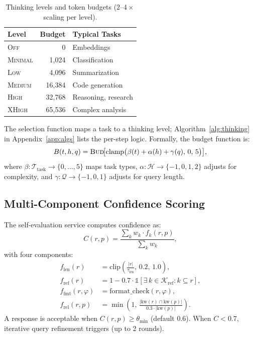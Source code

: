 \documentclass{article}
\theoremstyle{plain}
\theoremstyle{definition}
\newcommand{\indicator}{\mathbb{1}}
\begin{document}
\begin{table}[t]
\caption{Thinking levels and token budgets ($2$--$4\times$ scaling per level).}
\label{tab:thinking}
\centering
\small
\begin{tabular}{@{}lrl@{}}
\toprule
\textbf{Level} & \textbf{Budget} & \textbf{Typical Tasks} \\
\midrule
\textsc{Off}     & 0       & Embeddings \\
\textsc{Minimal} & 1{,}024   & Classification \\
\textsc{Low}     & 4{,}096   & Summarization \\
\textsc{Medium}  & 16{,}384  & Code generation \\
\textsc{High}    & 32{,}768  & Reasoning, research \\
\textsc{XHigh}   & 65{,}536  & Complex analysis \\
\bottomrule
\end{tabular}
\end{table}

The selection function maps a task to a thinking level;
Algorithm~\ref{alg:thinking} in Appendix~\ref{app:algs} lists the per-step
logic.  Formally, the budget function is:
\begin{equation}\label{eq:budget}
  B(t, h, q) = \textsc{Bud}\!\bigl[\mathrm{clamp}\bigl(\beta(t) + \alpha(h) + \gamma(q),\, 0,\, 5\bigr)\bigr],
\end{equation}
where $\beta\!: \mathcal{T}_\mathrm{task} \to \{0,\ldots,5\}$ maps task types,
$\alpha\!: \mathcal{H} \to \{-1, 0, 1, 2\}$ adjusts for complexity, and
$\gamma\!: \mathcal{Q} \to \{-1, 0, 1\}$ adjusts for query length.

\subsection{Multi-Component Confidence Scoring}\label{sec:confidence}

The self-evaluation service computes confidence as:
\begin{equation}\label{eq:confidence}
  C(r, p) = \frac{\sum_{k} w_k \cdot f_k(r, p)}{\sum_{k} w_k},
\end{equation}
with four components:
\begin{align}
  f_\mathrm{len}(r) &= \mathrm{clip}\!\left(\tfrac{|r|}{\tau_\mathrm{len}},\, 0.2,\, 1.0\right), \label{eq:f_len} \\
  f_\mathrm{ref}(r) &= 1 - 0.7 \cdot \indicator[\exists\, k {\in} \mathcal{K}_\mathrm{ref}\!: k {\subseteq} r], \label{eq:f_ref} \\
  f_\mathrm{fmt}(r, \varphi) &= \mathrm{format\_check}(r, \varphi), \label{eq:f_fmt} \\
  f_\mathrm{rel}(r, p) &= \min\!\left(1,\, \tfrac{|\mathrm{kw}(r) \cap \mathrm{kw}(p)|}{0.3 \cdot |\mathrm{kw}(p)|}\right). \label{eq:f_rel}
\end{align}
A response is acceptable when $C(r, p) \geq \theta_\mathrm{min}$ (default
$0.6$).  When $C < 0.7$, iterative query refinement triggers (up to 2 rounds).
\end{document}
